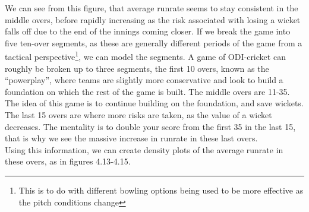 We can see from this figure, that average runrate seems to stay consistent in the middle overs, before rapidly increasing as the risk associated with losing 
a wicket falls off due to the end of the innings coming closer. If we break the game into five ten-over segments, as these are generally different periods of the game
from a tactical perspective\footnote{This is to do with different bowling options being used to be more effective as the pitch conditions change}, we can model the segments.
A game of ODI-cricket can roughly be broken up to three segments, the first 10 overs, known as the ``powerplay'', where teams are slightly more conservative and look to build a 
foundation on which the rest of the game is built. The middle overs are 11-35. The idea of this game is to continue building on the foundation, and save wickets. The last 
15 overs are where more risks are taken, as the value of a wicket decreases. The mentality is to double your score from the first 35 in the last 15, that is why we see the massive 
increase in runrate in these last overs. \\

Using this information, we can create density plots of the average runrate in these overs, as in figures 4.13-4.15. 

